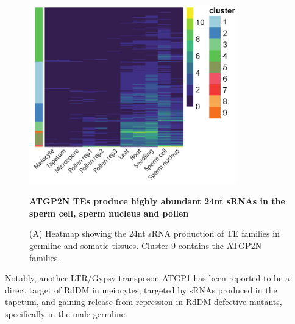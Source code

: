 \begin{figure}[htbp!] 
\centering    
    \includegraphics[width=0.8\textwidth]{Chapter2/Figs/Figure13_TE_families_heatmap.pdf}
\caption{\textbf{ATGP2N TEs produce highly abundant 24nt sRNAs in the sperm cell, sperm nucleus and pollen}}
\label{fig:TE_families}
\captionsetup{font=small}
    \caption*{(A) Heatmap showing the 24nt sRNA production of TE families in germline and somatic tissues. Cluster 9 contains the ATGP2N families.}
\end{figure}

Notably, another LTR/Gypsy transposon ATGP1 has been reported to be a direct target of RdDM in meiocytes, targeted by sRNAs produced in the tapetum, and gaining release from repression in RdDM defective mutants\citep{RN187}, specifically in the male germline.


